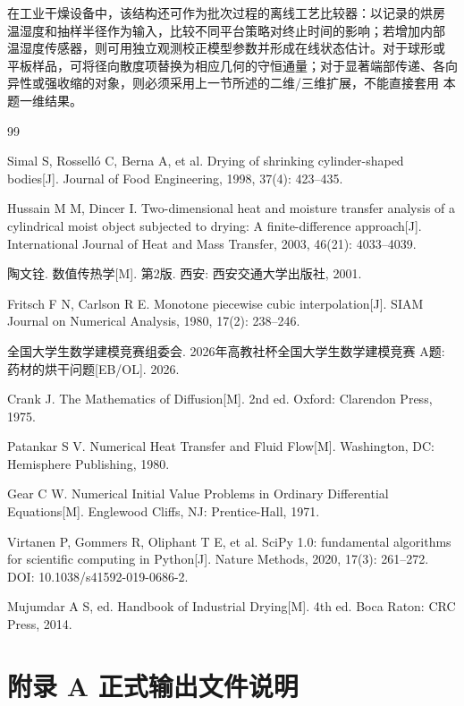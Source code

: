 \documentclass[withoutpreface,bwprint]{cumcmthesis}
\begin{document}
在工业干燥设备中，该结构还可作为批次过程的离线工艺比较器：以记录的烘房
温湿度和抽样半径作为输入，比较不同平台策略对终止时间的影响；若增加内部
温湿度传感器，则可用独立观测校正模型参数并形成在线状态估计。对于球形或
平板样品，可将径向散度项替换为相应几何的守恒通量；对于显著端部传递、各向
异性或强收缩的对象，则必须采用上一节所述的二维/三维扩展，不能直接套用
本题一维结果。

\begin{thebibliography}{99}

Simal S, Rossell\'o C, Berna A, et al. Drying of shrinking
cylinder-shaped bodies[J]. Journal of Food Engineering, 1998,
37(4): 423--435.

Hussain M M, Dincer I. Two-dimensional heat and moisture transfer
analysis of a cylindrical moist object subjected to drying: A
finite-difference approach[J]. International Journal of Heat and
Mass Transfer, 2003, 46(21): 4033--4039.

陶文铨. 数值传热学[M]. 第2版. 西安: 西安交通大学出版社, 2001.

Fritsch F N, Carlson R E. Monotone piecewise cubic interpolation[J].
SIAM Journal on Numerical Analysis, 1980, 17(2): 238--246.

全国大学生数学建模竞赛组委会. 2026年高教社杯全国大学生数学建模竞赛
A题: 药材的烘干问题[EB/OL]. 2026.

Crank J. The Mathematics of Diffusion[M]. 2nd ed. Oxford: Clarendon Press,
1975.

Patankar S V. Numerical Heat Transfer and Fluid Flow[M]. Washington, DC:
Hemisphere Publishing, 1980.

Gear C W. Numerical Initial Value Problems in Ordinary Differential
Equations[M]. Englewood Cliffs, NJ: Prentice-Hall, 1971.

Virtanen P, Gommers R, Oliphant T E, et al. SciPy 1.0: fundamental algorithms
for scientific computing in Python[J]. Nature Methods, 2020, 17(3): 261--272.
DOI: 10.1038/s41592-019-0686-2.

Mujumdar A S, ed. Handbook of Industrial Drying[M]. 4th ed. Boca Raton:
CRC Press, 2014.

\end{thebibliography}

\section*{附录 A \quad 正式输出文件说明}
\end{document}
